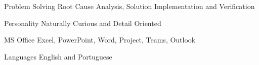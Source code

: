 


\begin{cvskills}


\cvskill
{Problem Solving} %
{Root Cause Analysis, Solution Implementation and Verification} %


\cvskill
{Personality} %
{Naturally Curious and Detail Oriented} %


\cvskill
{MS Office} %
{Excel, PowerPoint, Word, Project, Teams, Outlook} %


\cvskill
{Languages} %
{English and Portuguese} %


\end{cvskills}
